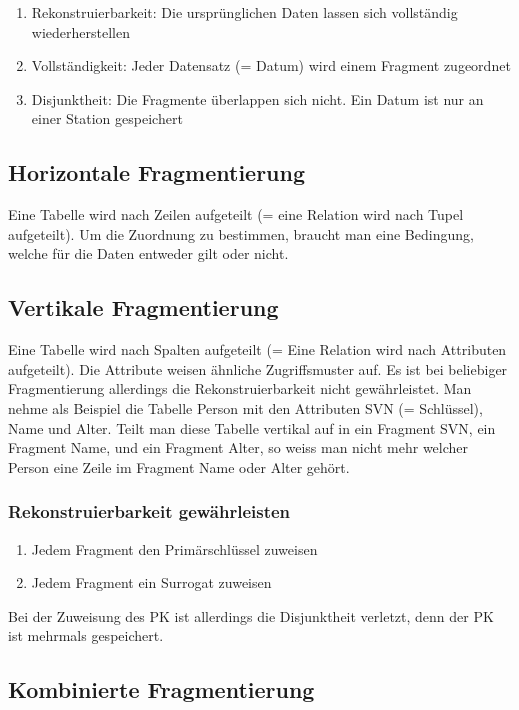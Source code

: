 \begin{enumerate}
    \item Rekonstruierbarkeit: Die ursprünglichen Daten lassen sich vollständig wiederherstellen
    \item Vollständigkeit: Jeder Datensatz (= Datum) wird einem Fragment zugeordnet
    \item Disjunktheit: Die Fragmente überlappen sich nicht. Ein Datum ist nur an einer Station gespeichert
\end{enumerate}

\subsection{Horizontale Fragmentierung}

Eine Tabelle wird nach Zeilen aufgeteilt (= eine Relation wird nach Tupel aufgeteilt). Um die Zuordnung zu bestimmen, braucht man eine Bedingung, welche für die Daten entweder gilt oder nicht.

\subsection{Vertikale Fragmentierung}

Eine Tabelle wird nach Spalten aufgeteilt (= Eine Relation wird nach Attributen aufgeteilt). Die Attribute weisen ähnliche Zugriffsmuster auf. Es ist bei beliebiger Fragmentierung allerdings die Rekonstruierbarkeit nicht gewährleistet. Man nehme als Beispiel die Tabelle Person mit den Attributen SVN (= Schlüssel), Name und Alter. Teilt man diese Tabelle vertikal auf in ein Fragment SVN, ein Fragment Name, und ein Fragment Alter, so weiss man nicht mehr welcher Person eine Zeile im Fragment Name oder Alter gehört.

\subsubsection{Rekonstruierbarkeit gewährleisten}

\begin{enumerate}
    \item Jedem Fragment den Primärschlüssel zuweisen
    \item Jedem Fragment ein Surrogat zuweisen
\end{enumerate}

Bei der Zuweisung des PK ist allerdings die Disjunktheit verletzt, denn der PK ist mehrmals gespeichert.

\subsection{Kombinierte Fragmentierung}

